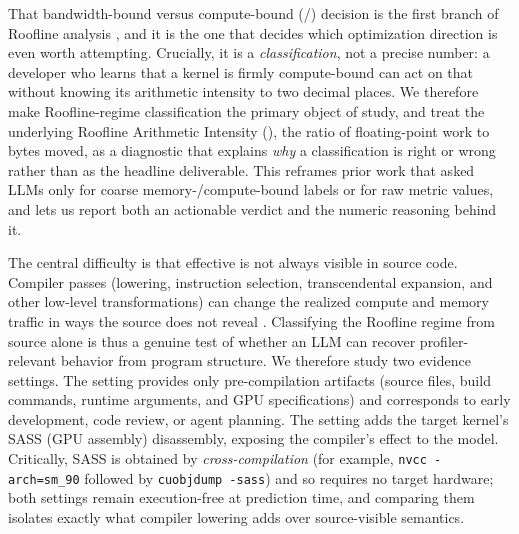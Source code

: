 That bandwidth-bound versus compute-bound (\bandwidthbound/\computebound) decision is the first branch of Roofline analysis \cite{samuelwilliamsRooflineInsightfulVisual2009}, and it is the one that decides which optimization direction is even worth attempting.
Crucially, it is a \emph{classification}, not a precise number: a developer who learns that a kernel is firmly compute-bound can act on that without knowing its arithmetic intensity to two decimal places.
We therefore make Roofline-regime classification the primary object of study, and treat the underlying Roofline Arithmetic Intensity (\rai), the ratio of floating-point work to bytes moved, as a diagnostic that explains \emph{why} a classification is right or wrong rather than as the headline deliverable.
This reframes prior work that asked LLMs only for coarse memory-/compute-bound labels \cite{boletCanLargeLanguage2025} or for raw metric values, and lets us report both an actionable verdict and the numeric reasoning behind it.

The central difficulty is that effective \rai is not always visible in source code.
Compiler passes (lowering, instruction selection, transcendental expansion, and other low-level transformations) can change the realized compute and memory traffic in ways the source does not reveal \cite{alfredCompilersPrinciplesTechniques2007}.
Classifying the Roofline regime from source alone is thus a genuine test of whether an LLM can recover profiler-relevant behavior from program structure.
We therefore study two evidence settings.
The \sourceonly setting provides only pre-compilation artifacts (source files, build commands, runtime arguments, and GPU specifications) and corresponds to early development, code review, or agent planning.
The \sourcesass setting adds the target kernel's SASS (GPU assembly) disassembly, exposing the compiler's effect to the model.
Critically, SASS is obtained by \emph{cross-compilation} (for example, \texttt{nvcc -arch=sm\_90} followed by \texttt{cuobjdump -sass}) and so requires no target hardware; both settings remain execution-free at prediction time, and comparing them isolates exactly what compiler lowering adds over source-visible semantics.

